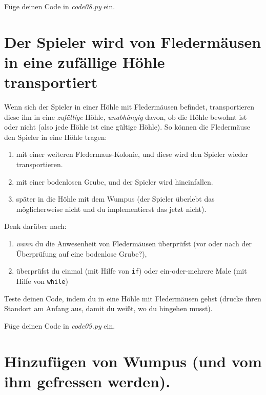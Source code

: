 \documentclass[
]{book}
\providecommand{\tightlist}{%
  \setlength{\itemsep}{0pt}\setlength{\parskip}{0pt}}
\begin{document}
Füge deinen Code in \emph{code08.py} ein.

\hypertarget{der-spieler-wird-von-fledermuxe4usen-in-eine-zufuxe4llige-huxf6hle-transportiert}{%
\section{Der Spieler wird von Fledermäusen in eine zufällige Höhle transportiert}\label{der-spieler-wird-von-fledermuxe4usen-in-eine-zufuxe4llige-huxf6hle-transportiert}}

Wenn sich der Spieler in einer Höhle mit Fledermäusen befindet, transportieren diese ihn in eine \emph{zufällige} Höhle, \emph{unabhängig} davon, ob die Höhle bewohnt ist oder nicht (also jede Höhle ist eine gültige Höhle). So können die Fledermäuse den Spieler in eine Höhle tragen:

\begin{enumerate}
\def\labelenumi{\arabic{enumi}.}
\tightlist
\item
  mit einer weiteren Fledermaus-Kolonie, und diese wird den Spieler wieder transportieren.
\item
  mit einer bodenlosen Grube, und der Spieler wird hineinfallen.
\item
  später in die Höhle mit dem Wumpus (der Spieler überlebt das möglicherweise nicht und du implementierst das jetzt nicht).
\end{enumerate}

Denk darüber nach:

\begin{enumerate}
\def\labelenumi{\arabic{enumi}.}
\tightlist
\item
  \emph{wann} du die Anwesenheit von Fledermäusen überprüfst (vor oder nach der Überprüfung auf eine bodenlose Grube?),
\item
  überprüfst du einmal (mit Hilfe von \texttt{if}) oder ein-oder-mehrere Male (mit Hilfe von \texttt{while})
\end{enumerate}

Teste deinen Code, indem du in eine Höhle mit Fledermäusen gehst (drucke ihren Standort am Anfang aus, damit du weißt, wo du hingehen musst).

Füge deinen Code in \emph{code09.py} ein.

\hypertarget{hinzufuxfcgen-von-wumpus-und-vom-ihm-gefressen-werden.}{%
\section{Hinzufügen von Wumpus (und vom ihm gefressen werden).}\label{hinzufuxfcgen-von-wumpus-und-vom-ihm-gefressen-werden.}}
\end{document}
